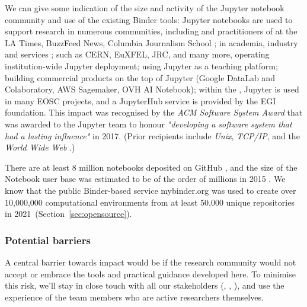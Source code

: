 \medskip

We can give some indication of the size and activity of the Jupyter notebook
community and use of the existing Binder tools: Jupyter notebooks are used to
support research in numerous communities, including
{} and practitioners of  at the LA Times, BuzzFeed News, Columbia Journalism School
\cite{latimes-datadesk} \cite{columbia-nytimes} \cite{data-journalism};
 in academia, industry and services \cite{Perkel2018};
{} such as CERN, EuXFEL, JRC, and many more,
operating institution-wide Jupyter deployment;
{} using Jupyter as a teaching platform;
{} building commercial products on the
top of Jupyter (Google DataLab and Colaboratory, AWS Sagemaker, OVH AI Notebook);
within the , Jupyter is used in many EOSC
projects, and a JupyterHub service is provided by the EGI foundation.
This impact was recognised by the \emph{ACM Software System Award} that was
awarded to the Jupyter team to honour \emph{"developing a software system that
had a lasting influence"} in 2017. (Prior recipients include \emph{Unix},
\emph{TCP/IP}, and the \emph{World Wide Web} \cite{acm-award}.)

There are at least 8 million notebooks deposited on GitHub \cite{notebookcount}, and
the size of the Notebook user base was estimated to be of the order of
millions in 2015 \cite{jupyter-grant}. We know that the public Binder-based service mybinder.org
was used to create over 10,000,000 computational environments
from at least 50,000 unique repositories in 2021~(Section~\ref{sec:opensource}).



\subsubsection{Potential barriers}

A central barrier towards impact would be if the research community would not
accept or embrace the tools and practical guidance developed here.
To minimise this risk, we'll stay in close touch with all our stakeholders
(, , ), and use
the experience of the team members who are active researchers themselves.

